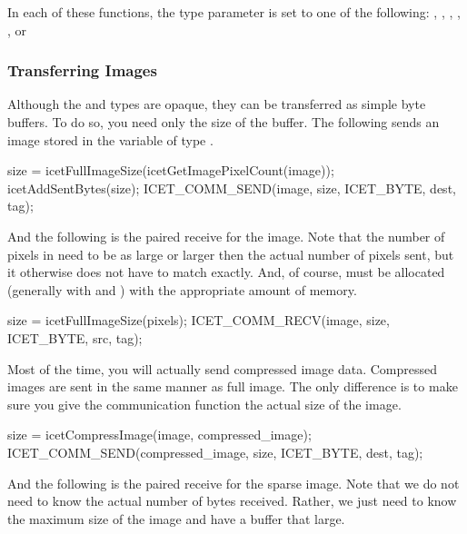 In each of these functions, the type parameter is set to one of the
following: , , ,
, , or 

\subsubsection{Transferring Images}
\label{sec:Strategies:New:Communications:Transferring_Images}

Although the  and  types are
opaque, they can be transferred as simple byte buffers.  To do so, you need
only the size of the buffer.  The following sends an image stored in the
variable  of type .

\begin{code}
  size = icetFullImageSize(icetGetImagePixelCount(image));
  icetAddSentBytes(size);
  ICET_COMM_SEND(image, size, ICET_BYTE, dest, tag);
\end{code}

And the following is the paired receive for the image.  Note that the
number of pixels in  need to be as large or larger then
the actual number of pixels sent, but it otherwise does not have to match
exactly.  And, of course,  must be allocated (generally with
 and ) with the
appropriate amount of memory.

\begin{code}
  size = icetFullImageSize(pixels);
  ICET_COMM_RECV(image, size, ICET_BYTE, src, tag);
\end{code}

Most of the time, you will actually send compressed image data.  Compressed
images are sent in the same manner as full image.  The only difference is
to make sure you give the communication function the actual size of the
image.

\begin{code}
  size = icetCompressImage(image, compressed_image);
  ICET_COMM_SEND(compressed_image, size, ICET_BYTE, dest, tag);
\end{code}

And the following is the paired receive for the sparse image.  Note that we
do not need to know the actual number of bytes received.  Rather, we just
need to know the maximum size of the image and have a buffer that large.

